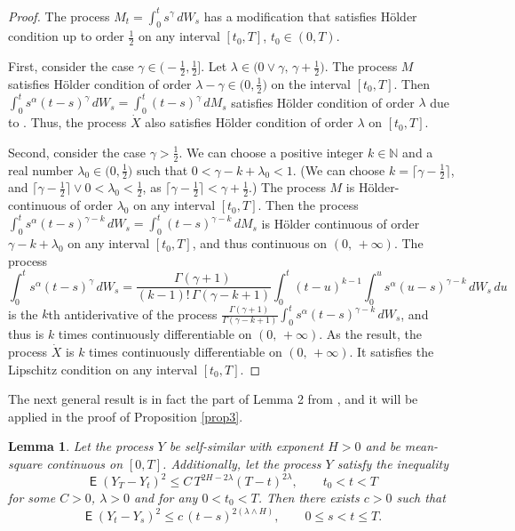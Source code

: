 \documentclass{article}
\DeclareMathOperator{\ME}{\mathsf{E}}
\DeclareMathOperator{\funceil}{ceil}
\newcommand{\dotX}{\dot{X}}
\theoremstyle{plain}
\newtheorem{lemma}{Lemma}
\theoremstyle{remark}
\theoremstyle{definition}
\begin{document}
\begin{proof}
The process $M_t = \int_0^t s^\gamma \, dW_s$
has a modification that satisfies H\"older
condition up to order $\frac12$ on any interval $[t_0, T]$, $t_0\mathbin{\in}(0, T)$.

First, consider the case $\gamma\in\bigl(-\frac12,\frac12\bigr]$.
Let $\lambda \in \bigl(0 \mathbin{\vee} \gamma,\,\allowbreak \gamma+\frac12
\bigr)$.
The process $M$ satisfies H\"older condition of
order $\lambda-\gamma \in \bigl(0, \frac12)$
on the interval $[t_0, T]$.
Then $\int_0^t s^\alpha (t-s)^\gamma \, dW_s = \int_0^t
(t-s)^\gamma \, dM_s$
satisfies H\"older condition of order $\lambda$
due to \cite[Lemma~2.1]{Norros1999}.
Thus, the process $\dotX$ also satisfies
H\"older condition of order $\lambda$ on $[t_0,T]$.

Second, consider the case $\gamma > \frac12$.
We can choose a positive integer $k\in\mathbb{N}$ and a real number
$\lambda_0 \in \bigl(0,\frac12\bigr)$
such that $0<\gamma - k + \lambda_0 < 1$.
	(We can choose $k = \lceil \gamma-\frac12\rceil$,
	and $\lceil \gamma-\frac12\rceil \vee 0 < \lambda_0 < \frac12$,
	as $\lceil \gamma-\frac12 \rceil < \gamma+\frac12$.)
The process $M$ is H\"older-continuous
of order $\lambda_0$ on any interval $[t_0, T]$.
Then the process
$\int_0^t s^\alpha (t-s)^{\gamma-k} \, dW_s = \int_0^t
(t-s)^{\gamma-k} \, dM_s$
is H\"older continuous of order
$\gamma - k + \lambda_0$ on any interval $[t_0, T]$, and thus
continuous on $(0,\, {+}\infty)$.
The process
\[
\int_0^t s^\alpha (t-s)^\gamma \, dW_s
= \frac{\Gamma(\gamma{+}1)\, }  {(k{-}1)! \,  \Gamma(\gamma{-}k{+}1)}
\int_0^t (t-u)^{k-1} \int_0^u s^\alpha (u-s)^{\gamma-k} \, dW_s  \, du
\]
is the $k$th antiderivative of the process
$\frac{\Gamma(\gamma{+}1)\, }  { \Gamma(\gamma-k+1)}
\int_0^t s^\alpha (t-s)^{\gamma-k} \, dW_s$,
and thus is $k$ times continuously differentiable on
$(0,\, {+}\infty)$.
As the result, the process $\dotX$
is $k$ times continuously differentiable on
$(0,\, {+}\infty)$.
It satisfies the Lipschitz condition on
any interval $[t_0, T]$.
\end{proof}
The next general  result is in fact the part of Lemma 2 from \cite{Part 1}, and it will be applied in the proof of Proposition \ref{prop3}.

\begin{lemma}\label{lem:Lemma-upperhelix}
Let the process $Y$ be self-similar   with exponent $H>0$ and be 
mean-square continuous on $[0,T]$. Additionally, let 
the process $Y$ satisfy the inequality
\[
\ME(Y_T - Y_t)^2 \le C\, T^{2H-2\lambda} (T - t)^{2\lambda} , \qquad
t_0\mathbin{<}t\mathbin{<}T 
\]
for some
$C>0$, $\lambda>0$ and for any $0<t_0<T$.
Then there exists $c>0$ such that
\[
\ME(Y_t - Y_s)^2 \le c\, (t-s)^{2 (\lambda \wedge H)} , \qquad
0\mathbin{\le}s\mathbin{<}t\mathbin{\le}T.
\]
\end{lemma}
\end{document}
